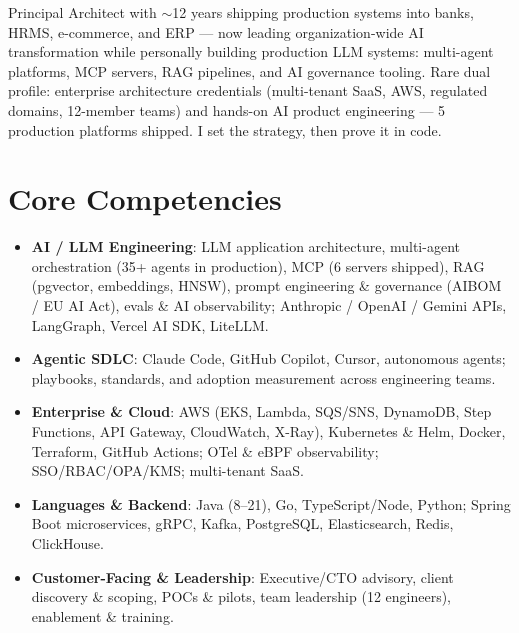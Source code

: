 \documentclass[11pt,a4paper,sans]{moderncv}
\begin{document}
\makecvtitle


\vspace{6pt}
\small{Principal Architect with $\sim$12 years shipping production systems into banks, HRMS, e-commerce, and ERP --- now leading organization-wide AI transformation while personally building production LLM systems: multi-agent platforms, MCP servers, RAG pipelines, and AI governance tooling. Rare dual profile: enterprise architecture credentials (multi-tenant SaaS, AWS, regulated domains, 12-member teams) and hands-on AI product engineering --- 5 production platforms shipped. I set the strategy, then prove it in code.}


\section{Core Competencies}
\vspace{1pt}
\begin{itemize}

\item \textbf{AI / LLM Engineering}: LLM application architecture, multi-agent orchestration (35+ agents in production), MCP (6 servers shipped), RAG (pgvector, embeddings, HNSW), prompt engineering \& governance (AIBOM / EU AI Act), evals \& AI observability; Anthropic / OpenAI / Gemini APIs, LangGraph, Vercel AI SDK, LiteLLM.

\item \textbf{Agentic SDLC}: Claude Code, GitHub Copilot, Cursor, autonomous agents; playbooks, standards, and adoption measurement across engineering teams.

\item \textbf{Enterprise \& Cloud}: AWS (EKS, Lambda, SQS/SNS, DynamoDB, Step Functions, API Gateway, CloudWatch, X-Ray), Kubernetes \& Helm, Docker, Terraform, GitHub Actions; OTel \& eBPF observability; SSO/RBAC/OPA/KMS; multi-tenant SaaS.

\item \textbf{Languages \& Backend}: Java (8--21), Go, TypeScript/Node, Python; Spring Boot microservices, gRPC, Kafka, PostgreSQL, Elasticsearch, Redis, ClickHouse.

\item \textbf{Customer-Facing \& Leadership}: Executive/CTO advisory, client discovery \& scoping, POCs \& pilots, team leadership (12 engineers), enablement \& training.

\end{itemize}
\end{document}
